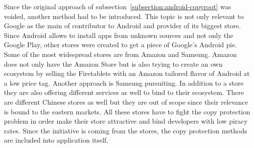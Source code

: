 Since the original approach of subsection~\ref{subsection:android-copyroot} was voided, another method had to be introduced.
This topic is not only relevant to Google as the main of contributor to Android and provider of its biggest store.
Since Android allows to install apps from unknown sources and not only the Google Play, other stores were created to get a piece of Google's Android pie.
Some of the most widespread stores are from Amazon and Samsung.
Amazon does not only have the Amazon Store but is also trying to create an own ecosystem by selling the Firetablets with an Amazon tailored flavor of Android at a low price tag.
Another approach is Samsung pursuiting. In addition to a store they are also offering different services as well to bind to their ecosystem.
There are different Chinese stores as well but they are out of scope since their relevance is bound to the eastern markets.
\newline
All these stores have to fight the copy protection problem in order make their store attractive and bind developers with low piracy rates.
Since the initiative is coming from the stores, the copy protection methods are included into application itself. \cite{munteanLicense}
